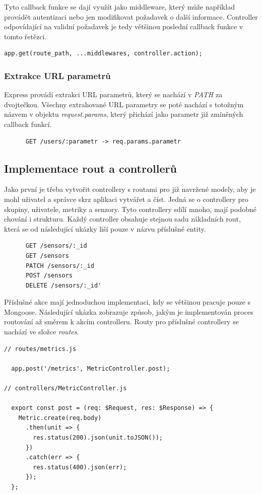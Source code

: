 \documentclass[thesis=M,czech]{FITthesis}[2018/10/20]
\begin{document}
Tyto callback funkce se dají využít jako middleware, který může například provádět autentizaci nebo jen modifikovat požadavek o další informace. Controller odpovídající na validní požadavek je tedy většinou poslední callback funkce v tomto řetězci.
\begin{lstlisting}
app.get(route_path, ...middlewares, controller.action);
\end{lstlisting}

\subsubsection{Extrakce URL parametrů}
Express provádí extrakci URL parametrů, který se nachází v \textit{PATH} za dvojtečkou. Všechny extrahované URL parametry se poté nachází s totožným názvem v objektu \textit{request.params}, který přichází jako parametr již zmíněných callback funkcí.

\begin{lstlisting}
      GET /users/:parametr -> req.params.parametr
\end{lstlisting}
\subsection{Implementace rout a controllerů}
Jako první je třeba vytvořit controllery s routami pro již navržené modely, aby je mohl uživatel a správce skrz aplikaci vytvářet a číst. Jedná se o controllery pro skupiny, uživatele, metriky a senzory. Tyto controllery sdílí mnoho, mají podobné chování i strukturu. Každý controller obsahuje stejnou sadu základních rout, která se od následující ukázky liší pouze v názvu příslušné entity.
\begin{lstlisting}
      GET /sensors/:_id
      GET /sensors
      PATCH /sensors/:_id
      POST /sensors
      DELETE /sensors/:_id'
\end{lstlisting}
Příslušné akce mají jednoduchou implementaci, kdy se většinou pracuje pouze s Mongoose. Následující ukázka zobrazuje způsob, jakým je implementován proces routování až směrem k akcím controlleru. Routy pro příslušné controllery se nachází ve složce \textit{routes}.
\begin{lstlisting}
// routes/metrics.js

  app.post('/metrics', MetricController.post);
  
// controllers/MetricController.js

  export const post = (req: $Request, res: $Response) => {
    Metric.create(req.body)
      .then(unit => {
        res.status(200).json(unit.toJSON());
      })  
      .catch(err => {
        res.status(400).json(err);
      }); 
  };
\end{lstlisting}
\end{document}
